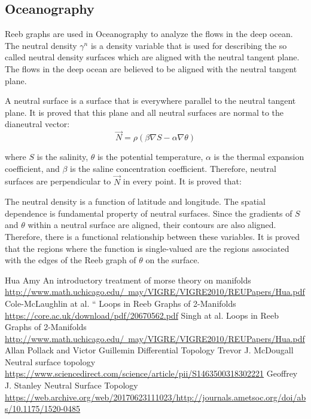 \documentclass[]{article}
\begin{document}
\subsection{Oceanography}
    Reeb graphs are used in Oceanography to analyze the flows in the deep ocean. The neutral density $\gamma^n$ is a density variable that is used 
    for describing the so called neutral density surfaces which are aligned with the neutral tangent plane. The flows in the deep ocean are believed to be aligned with the neutral
    tangent plane.

    A neutral surface is a surface that is everywhere parallel to the neutral tangent plane. It is proved that this plane and all neutral surfaces are normal to
    the dianeutral vector:
   $$
    \vec{N}=\rho(\beta \nabla S-\alpha \nabla\theta)
   $$

   where $S$ is the salinity, $\theta$ is the potential temperature, $\alpha$ is the thermal expansion coefficient,
   and $\beta$ is the saline concentration coefficient. Therefore, neutral surfaces are perpendicular to $\vec{N}$ in every point. It is proved that:

   The neutral density is a function of latitude and longitude. The spatial dependence is fundamental property
   of neutral surfaces. Since the gradients of $S$ and $\theta$ within a neutral surface are aligned, their contours are also aligned.
   Therefore, there is a functional relationship between these variables. It is proved that the regions where
   the function is single-valued are the regions associated with the edges of the Reeb graph of $\theta$ on the surface.

\begin{thebibliography}{9}
     {\sc Hua Amy}
       An introductory treatment of morse theory on manifolds
       \href{http://www.math.uchicago.edu/~may/VIGRE/VIGRE2010/REUPapers/Hua.pdf}{http://www.math.uchicago.edu/~may/VIGRE/VIGRE2010/REUPapers/Hua.pdf}
     {\sc Cole-McLaughlin at al.} 
       `` Loops in Reeb Graphs of 2-Manifolds  \href{https://core.ac.uk/download/pdf/20670562.pdf}{https://core.ac.uk/download/pdf/20670562.pdf}
         {\sc Singh at al. }
          Loops in Reeb Graphs of 2-Manifolds \href{http://www.math.uchicago.edu/~may/VIGRE/VIGRE2010/REUPapers/Hua.pdf}{http://www.math.uchicago.edu/~may/VIGRE/VIGRE2010/REUPapers/Hua.pdf}
        {\sc Allan Pollack and Victor Guillemin } 
        Differential Topology
        {\sc Trevor J. McDougall}
        Neutral surface topology \href{https://www.sciencedirect.com/science/article/pii/S1463500318302221}{https://www.sciencedirect.com/science/article/pii/S1463500318302221}
        {\sc Geoffrey J. Stanley}
        Neutral Surface Topology \href{https://web.archive.org/web/20170623111023/http://journals.ametsoc.org/doi/abs/10.1175/1520-0485%281987%29017%3C1950%3ANS%3E2.0.CO%3B2}{https://web.archive.org/web/20170623111023/http://journals.ametsoc.org/doi/abs/10.1175/1520-0485}

\end{thebibliography}
\end{document}

